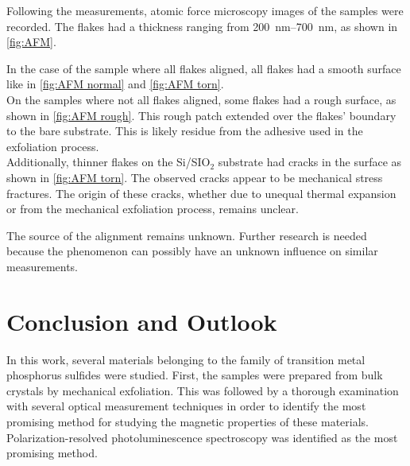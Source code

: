 \documentclass[
	twoside,
	parskip=half,
	a4paper,
]{scrbook}
\begin{document}
Following the measurements, atomic force microscopy images of the samples were recorded.
The flakes had a thickness ranging from \SIrange{200}{700}{nm}, as shown in \autoref{fig:AFM}.

In the case of the sample where all flakes aligned, all flakes had a smooth surface like in \autoref{fig:AFM normal} and \autoref{fig:AFM torn}.\\
On the samples where not all flakes aligned, some flakes had a rough surface, as shown in \autoref{fig:AFM rough}.
This rough patch extended over the flakes' boundary to the bare substrate.
This is likely residue from the adhesive used in the exfoliation process.\\
Additionally, thinner flakes on the Si/SIO$_2$ substrate had cracks in the surface as shown in \autoref{fig:AFM torn}.
The observed cracks appear to be mechanical stress fractures.
The origin of these cracks, whether due to unequal thermal expansion or from the mechanical exfoliation process, remains unclear. 

The source of the alignment remains unknown. 
Further research is needed because the phenomenon can possibly have an unknown influence on similar measurements.

\chapter{Conclusion and Outlook}
In this work, several materials belonging to the family of transition metal phosphorus sulfides were studied.
First, the samples were prepared from bulk crystals by mechanical exfoliation.
This was followed by a thorough examination with several optical measurement techniques in order to identify the most promising method for studying the magnetic properties of these materials.
Polarization-resolved photoluminescence spectroscopy was identified as the most promising method.
\end{document}
